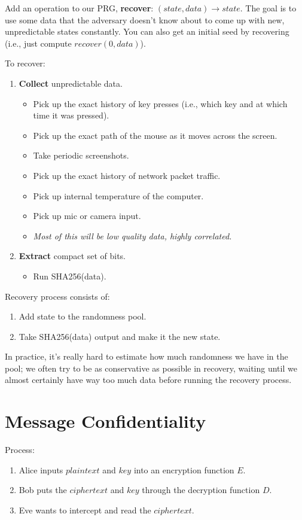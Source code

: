 \documentclass[12pt]{article}
\begin{document}
Add an operation to our PRG, \textbf{recover}: $(state, data) \rightarrow state$. The goal is to use some data that the adversary doesn't know about to come up with new, unpredictable states constantly. You can also get an initial seed by recovering (i.e., just compute $recover(0, data)$).

To recover:
\begin{enumerate}
\item \textbf{Collect} unpredictable data.
\begin{itemize}
\item Pick up the exact history of key presses (i.e., which key and at which time it was pressed).
\item Pick up the exact path of the mouse as it moves across the screen.
\item Take periodic screenshots.
\item Pick up the exact history of network packet traffic.
\item Pick up internal temperature of the computer.
\item Pick up mic or camera input.
\item \textit{Most of this will be low quality data, highly correlated.}
\end{itemize}
\item \textbf{Extract} compact set of bits.
\begin{itemize}
\item Run SHA256(data).
\end{itemize}
\end{enumerate}

Recovery process consists of:
\begin{enumerate}
\item Add state to the randomness pool.
\item Take SHA256(data) output and make it the new state.
\end{enumerate}

In practice, it's really hard to estimate how much randomness we have in the pool; we often try to be as conservative as possible in recovery, waiting until we almost certainly have way too much data before running the recovery process.

\section*{Message Confidentiality}

Process:
\begin{enumerate}
\item Alice inputs $plaintext$ and $key$ into an encryption function $E$.
\item Bob puts the $ciphertext$ and $key$ through the decryption function $D$.
\item Eve wants to intercept and read the $ciphertext$.
\end{enumerate}
\end{document}
